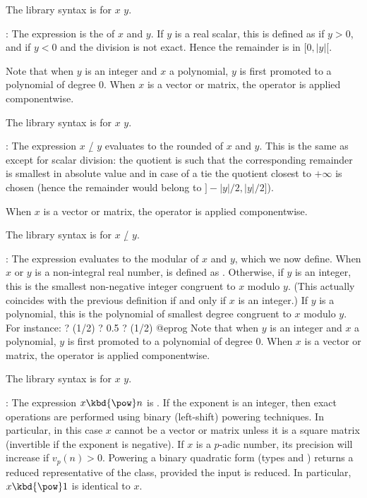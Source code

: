 The library syntax is  for $x$ \kbd{/} $y$.

\subseckbd{\bs}: The expression  is the  of $x$ and $y$. If $y$ is a real scalar, this is defined as
 if $y > 0$, and  if $y < 0$ and
the division is not exact. Hence the remainder 
is in $[0, |y|[$.

Note that when $y$ is an integer and $x$ a polynomial, $y$ is first promoted
to a polynomial of degree $0$. When $x$ is a vector or matrix, the operator
is applied componentwise.

The library syntax is 
for $x$ \kbd{\bs} $y$.

\subseckbd{\bs/}: The expression $x$ \b{/} $y$ evaluates to the rounded
 of $x$ and $y$. This is the same as 
except for scalar division: the quotient is such that the corresponding
remainder is smallest in absolute value and in case of a tie the quotient
closest to $+\infty$ is chosen (hence the remainder would belong to
$]{-}|y|/2, |y|/2]$).

When $x$ is a vector or matrix, the operator is applied componentwise.

The library syntax is 
for $x$ \b{/} $y$.

\subseckbd{\%}: The expression  evaluates to the modular
 of $x$ and $y$, which we now define. When $x$ or $y$
is a non-integral real number,  is defined as . Otherwise, if $y$ is an integer, this is the smallest
non-negative integer congruent to $x$ modulo $y$. (This actually coincides with
the previous definition if and only if $x$ is an integer.) If $y$ is a
polynomial, this is the polynomial of smallest degree congruent to $x$ modulo
$y$. For instance:
\bprog
? (1/2) %
? 0.5 %
? (1/2) %
@eprog
Note that when $y$ is an integer and $x$ a polynomial, $y$ is first promoted
to a polynomial of degree $0$. When $x$ is a vector or matrix, the operator
is applied componentwise.

The library syntax is 
for $x$ \kbd{\%} $y$.

\subseckbd{\pow}: The expression $x\hbox{\kbd{\pow}}n$ is .
If the exponent is an integer, then exact operations are performed using
binary (left-shift) powering techniques. In particular, in this case $x$
cannot be a vector or matrix unless it is a square matrix (invertible
if the exponent is negative). If $x$ is a $p$-adic number, its
precision will increase if $v_p(n) > 0$. Powering a binary quadratic form
(types  and ) returns a reduced representative of the
class, provided the input is reduced. In particular, $x\hbox{\kbd{\pow}}1$ is
identical to $x$.

